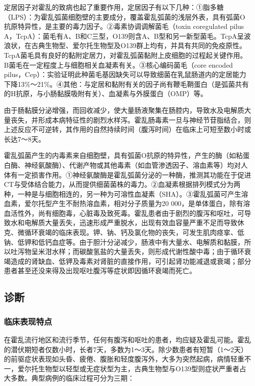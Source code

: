 定居因子对霍乱的致病也起了重要作用，定居因子有以下几种：①脂多糖（LPS）：为霍乱弧菌细胞壁的主要成分，覆盖霍乱弧菌的浅层外表，具有弧菌O抗原特异性，是主要的毒力因子。②毒素协调调解菌毛（toxin
coregulated pilus
A，TcpA）：菌毛有A、B和C三型，O139则含A、B型和另一新型菌毛。TcpA呈波浪状，在古典生物型、爱尔托生物型及O139群上均有，并具有共同的免疫原性。TcpA菌毛具有良好的黏附定居力，对霍乱弧菌黏附上皮细胞的过程起关键作用。B菌毛在一定程度上与细胞相关血凝素有关。③核心编码菌毛（core
encoded
pilus，Cep）：实验证明此种菌毛基因缺失可以导致细菌在乳鼠肠道内的定居能力下降13\%～21\%。④其他：与定居和黏附有关的因子尚有鞭毛鞘蛋白（是弧菌共有的H抗原，与小肠黏膜吸附有关）、血凝素与外膜蛋白（OMP）等。

由于肠黏膜分泌增强，而回收减少，使大量肠液聚集在肠腔内，导致水及电解质大量丧失，并形成本病特征性的剧烈水样泻。霍乱肠毒素一旦与神经节苷脂结合，则上述反应不可逆转，其作用的自然持续时间（腹泻时间）在临床上可短至数小时或长达7～8天。

霍乱弧菌产生的内毒素来自细胞壁，具有弧菌O抗原的特异性，产生的酶（如粘蛋白酶、神经氨酸酶）、代谢产物或其他毒素（如血管渗透因子、溶血素等）均对人体有一定损害作用。①神经氨酸酶是霍乱弧菌分泌的一种酶，推测其功能在于促进CT与受体结合能力，从而提供细菌菌株的毒力。②血凝素根据排列模式分为两种，一种是与细胞相连的，另一种为可溶性血凝素（SHA）。③霍乱弧菌可产生溶血素，爱尔托型产生不耐热溶血素，相对分子质量为20
000，是单体蛋白，除有溶血活性外，尚有细胞毒，心脏毒及致死毒。霍乱患者由于剧烈的腹泻和呕吐，可导致水和电解质大量丢失，迅速形成严重脱水，出现有效血容量严重不足而导致休克、微循环衰竭的临床表现。钾、钠、钙及氯化物的丧失，可发生肌肉痉挛、低钠、低钾和低钙血症等。由于胆汁分泌减少，肠液中有大量水、电解质和黏膜，所以吐泻物呈米泔水样；而碳酸氢盐的大量丢失，则形成代谢性酸中毒；由于循环衰竭造成的肾缺血、低钾及毒素对肾脏的直接作用，可引起肾功能减退或衰竭；部分患者甚至还没来得及出现呕吐腹泻等症状即因循环衰竭而死亡。

\subsection{诊断}

\subsubsection{临床表现特点}

在霍乱流行地区和流行季节，任何有腹泻和呕吐的患者，均应疑及霍乱可能。霍乱的潜伏期短者仅数小时，长者7天，多数为1～3天。除少数患者有短暂（1～2天）的前驱症状表现如头昏、疲倦、腹胀和轻度腹泻外，大多为突然起病，病情轻重不一，爱尔托生物型以轻型或无症状型为主，古典生物型与O139型则症状严重者占大多数。典型病例的临床过程可分为三期：

